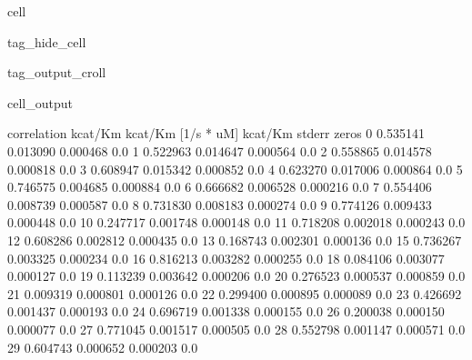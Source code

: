 \documentclass[letterpaper,10pt,english]{jupyterBook}
\begin{document}
\begin{sphinxuseclass}{cell}
\begin{sphinxuseclass}{tag_hide_cell}
\begin{sphinxuseclass}{tag_output_croll}
\begin{sphinxVerbatimOutput}
\begin{sphinxuseclass}{cell_output}
\begin{sphinxVerbatim}[commandchars=\\\{\}]
    correlation kcat/Km  kcat/Km [1/s * uM]  kcat/Km stderr  zeros  \PYGZbs{}
0              0.535141            0.013090        0.000468    0.0   
1              0.522963            0.014647        0.000564    0.0   
2              0.558865            0.014578        0.000818    0.0   
3              0.608947            0.015342        0.000852    0.0   
4              0.623270            0.017006        0.000864    0.0   
5              0.746575            0.004685        0.000884    0.0   
6              0.666682            0.006528        0.000216    0.0   
7              0.554406            0.008739        0.000587    0.0   
8              0.731830            0.008183        0.000274    0.0   
9              0.774126            0.009433        0.000448    0.0   
10             0.247717            0.001748        0.000148    0.0   
11            \PYGZhy{}0.718208            0.002018        0.000243    0.0   
12             0.608286            0.002812        0.000435    0.0   
13             0.168743            0.002301        0.000136    0.0   
15            \PYGZhy{}0.736267            0.003325        0.000234    0.0   
16             0.816213            0.003282        0.000255    0.0   
18             0.084106            0.003077        0.000127    0.0   
19            \PYGZhy{}0.113239            0.003642        0.000206    0.0   
20             0.276523            0.000537        0.000859    0.0   
21             0.009319            0.000801        0.000126    0.0   
22             0.299400            0.000895        0.000089    0.0   
23            \PYGZhy{}0.426692            0.001437        0.000193    0.0   
24            \PYGZhy{}0.696719            0.001338        0.000155    0.0   
26            \PYGZhy{}0.200038            0.000150        0.000077    0.0   
27             0.771045            0.001517        0.000505    0.0   
28             0.552798            0.001147        0.000571    0.0   
29             0.604743            0.000652        0.000203    0.0   


\end{sphinxVerbatim}
\end{sphinxuseclass}
\end{sphinxVerbatimOutput}
\end{sphinxuseclass}
\end{sphinxuseclass}
\end{sphinxuseclass}
\end{document}
